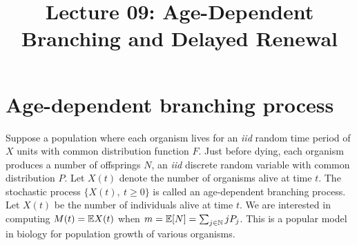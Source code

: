 \documentclass[a4paper,10pt,english]{article}
\title{Lecture 09: Age-Dependent Branching and Delayed Renewal}
\author{}
\begin{document}
\maketitle

\section{Age-dependent branching process }

Suppose a population where each organism lives for an \textit{iid} random time period of $X$ units with common distribution function $F$. 
Just before dying, each organism produces a number of offsprings $N$, an \textit{iid} discrete random variable with common distribution $P$.  
Let $X(t)$ denote the number of organisms alive at time $t$. 
The stochastic process $\{X(t),~ t \geqslant 0\}$ is called an age-dependent branching process. 
Let $X(t)$ be the number of individuals alive at time $t$. 
We are interested in computing $M(t)=\mathbb{E} X(t)$ when $m=\mathbb{E}[N] =\sum_{j \in \mathbb{N}}{j P_j}$. 
This is a popular model in biology for population growth of various organisms. 
\end{document}
